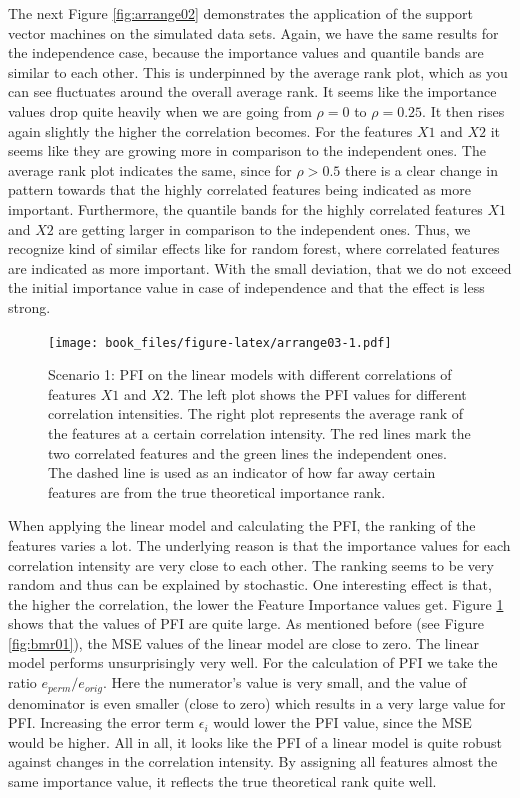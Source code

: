 \documentclass[]{krantz}
\begin{document}
The next Figure \ref{fig:arrange02} demonstrates the application of the
support vector machines on the simulated data sets. Again, we have the
same results for the independence case, because the importance values
and quantile bands are similar to each other. This is underpinned by the
average rank plot, which as you can see fluctuates around the overall
average rank. It seems like the importance values drop quite heavily
when we are going from \(\rho=0\) to \(\rho=0.25\). It then rises again
slightly the higher the correlation becomes. For the features \(X1\) and
\(X2\) it seems like they are growing more in comparison to the
independent ones. The average rank plot indicates the same, since for
\(\rho > 0.5\) there is a clear change in pattern towards that the
highly correlated features being indicated as more important.
Furthermore, the quantile bands for the highly correlated features
\(X1\) and \(X2\) are getting larger in comparison to the independent
ones. Thus, we recognize kind of similar effects like for random forest,
where correlated features are indicated as more important. With the
small deviation, that we do not exceed the initial importance value in
case of independence and that the effect is less strong.

\begin{figure}
\centering
\texttt{[image: book\_files/figure-latex/arrange03-1.pdf]}
\caption{\label{fig:arrange03}Scenario 1: PFI on the linear models with
different correlations of features \(X1\) and \(X2\). The left plot
shows the PFI values for different correlation intensities. The right
plot represents the average rank of the features at a certain
correlation intensity. The red lines mark the two correlated features
and the green lines the independent ones. The dashed line is used as an
indicator of how far away certain features are from the true theoretical
importance rank.}
\end{figure}

When applying the linear model and calculating the PFI, the ranking of
the features varies a lot. The underlying reason is that the importance
values for each correlation intensity are very close to each other. The
ranking seems to be very random and thus can be explained by stochastic.
One interesting effect is that, the higher the correlation, the lower
the Feature Importance values get. Figure \ref{fig:arrange03} shows that
the values of PFI are quite large. As mentioned before (see Figure
\ref{fig:bmr01}), the MSE values of the linear model are close to zero.
The linear model performs unsurprisingly very well. For the calculation
of PFI we take the ratio \(e_{perm}/e_{orig}\). Here the numerator's
value is very small, and the value of denominator is even smaller (close
to zero) which results in a very large value for PFI. Increasing the
error term \(\epsilon_{i}\) would lower the PFI value, since the MSE
would be higher. All in all, it looks like the PFI of a linear model is
quite robust against changes in the correlation intensity. By assigning
all features almost the same importance value, it reflects the true
theoretical rank quite well.
\end{document}
